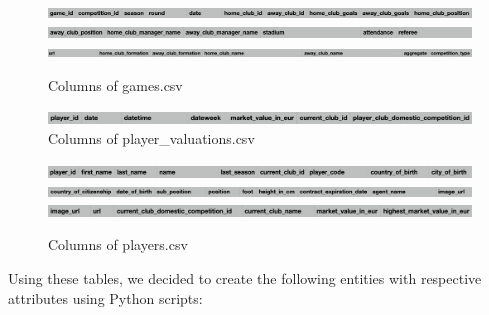 \documentclass{Configuration_Files/PoliMi3i_thesis}
\begin{document}
\begin{figure}[H]
    \centering
    \includegraphics[width=1\linewidth]{Project Template/Images/games1.png}
    \includegraphics[width=1\linewidth]{Project Template/Images/games2.png}
    \includegraphics[width=1\linewidth]{Project Template/Images/games3.png}
\caption{Columns of games.csv}
\end{figure}

\begin{figure}[H]
    \centering
    \includegraphics[width=1\linewidth]{Project Template/Images/valuations.png}
\caption{Columns of player\_valuations.csv}
\end{figure}

\begin{figure}[H]
    \centering
    \includegraphics[width=1\linewidth]{Project Template/Images/player1.png}
    \includegraphics[width=1\linewidth]{Project Template/Images/player2.png}
    \includegraphics[width=1\linewidth]{Project Template/Images/player3.png}
\caption{Columns of players.csv}
\end{figure}

Using these tables, we decided to create the following entities with respective attributes using Python scripts:
\end{document}
